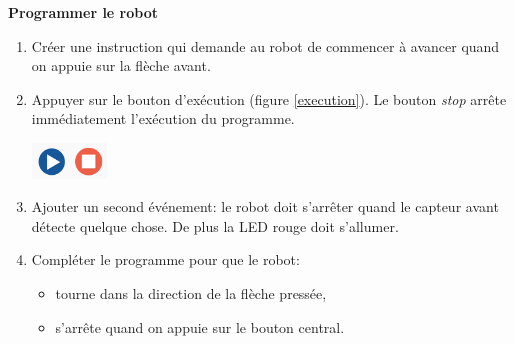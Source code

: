 \documentclass[a4paper,11pt]{article}
\begin{document}
\begin{activite}\textbf{Programmer le robot}
\begin{enumerate}
    \item Créer une instruction qui demande au robot de commencer à avancer quand on appuie sur la flèche avant.
    \item Appuyer sur le bouton d'exécution (figure \ref{execution}). Le bouton \emph{stop} arrête immédiatement l'exécution du programme.
\begin{center}
\centering
\includegraphics[width=2cm]{ressources/execution.png}
\label{execution}
\end{center}
    \item Ajouter un second événement: le robot doit s'arrêter quand le capteur avant détecte quelque chose. De plus la LED rouge doit s'allumer.
    \item Compléter le programme pour que le robot:
    \begin{itemize}
        \item tourne dans la direction de la flèche pressée,
        \item s'arrête quand on appuie sur le bouton central.
    \end{itemize}
\end{enumerate}
\end{activite}
\end{document}
